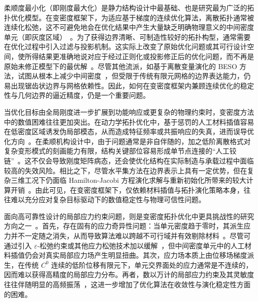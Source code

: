 柔顺度最小化（即刚度最大化）是静力结构设计中最基础、也是研究最为广泛的拓扑优化模型。在变密度框架下，为适应基于梯度的连续优化算法，离散拓扑通常被连续化松弛，这不可避免地会在优化结果中产生大量缺乏明确物理意义的中间密度单元（即灰度区域）~\cite{bendsoeMaterialInterpolationSchemes1999}。为了获得边界清晰、可制造性较好的拓扑构型，通常需要在优化过程中引入过滤与投影机制。这实际上改变了原始优化问题或其可行设计空间，使所得结果更准确地说对应于经过正则化或投影修正后的优化问题，而不再是原始未修正模型下的最优解~\cite{wangProjectionMethodsConvergence2011a}。尽管其他流派，如基于离散变量演化的 BESO 方法，试图从根本上减少中间密度~\cite{querinEvolutionaryStructuralOptimisation1998, huangEvolutionaryTopologyOptimization2010a}，但受限于传统有限元网格的边界表达能力，仍易出现锯齿状边界与网格依赖性。因此，如何在变密度框架内兼顾连续优化的稳定性与几何边界的逼近精度，仍是一个重要问题。

当优化目标由全局刚度进一步扩展到功能响应或更复杂的物理约束时，变密度方法中的数值困难往往更加突出。在动力学拓扑优化中，基于惩罚的人工材料插值容易在低密度区域诱发伪局部模态，从而造成特征频率或共振响应的失真，进而误导优化方向~\cite{pedersenMaximizationEigenvaluesUsing2000, tcherniakTopologyOptimizationResonating2002}。在柔顺机构设计中，由于问题通常是非自伴随的，加之低阶离散格式对复杂变形模式的刻画能力有限，结构关键部位容易形成单节点连接的“人工铰链”~\cite{sigmundDesignCompliantMechanisms1997a, peterssonSlopeConstrainedTopology1998}。这不仅会导致刚度矩阵病态，还会使优化结构在实际制造与承载过程中面临较高的失效风险。相比之下，尽管水平集方法在边界表示上具有一定优势，但在复杂三维工况下仍面临 Hamilton-Jacobi 方程演化求解与重新初始化所带来的较大计算开销~\cite{vandijkLevelsetMethodsStructural2013a}。由此可见，在变密度框架下，仅依赖材料插值与拓扑演化策略本身，往往难以充分应对复杂目标驱动下的数值稳定性与物理可信性问题。

面向高可靠性设计的局部应力约束问题，则是变密度拓扑优化中更具挑战性的研究方向之一~\cite{leStressbasedTopologyOptimization2010b}。首先，存在固有的应力奇异性问题：当单元密度趋于零时，其派生应力并不一定随之消失，从而导致算法难以跨越不可行域并有效剔除材料~\cite{chengStudyTopologyOptimization1992}。尽管可通过引入 $\varepsilon$-松弛约束或其他应力松弛技术加以缓解~\cite{chengErelaxedApproachStructural1997, bruggiAlternativeApproachStress2008a}，但中间密度单元中的人工材料插值仍会对真实局部应力场产生明显扭曲。其次，应力场本质上由位移场梯度派生，在传统 $C^0$ 连续的低阶位移有限元下，单元交界面处的应力通常是不连续的，因而难以获得高精度的局部应力分布。再者，数以万计的局部应力约束及其灵敏度往往伴随明显的高频振荡~\cite{duysinxNewDevelopmentsHandling1998, parisTopologyOptimizationContinuum2009}，这进一步增加了优化算法在收敛性与演化稳定性方面的困难。

